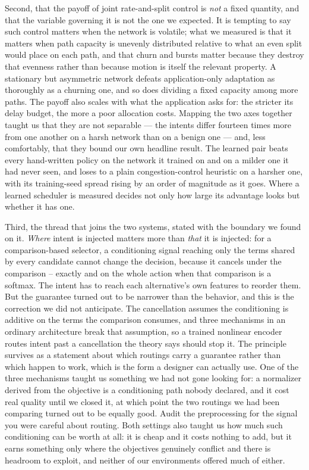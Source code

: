 Second, that the payoff of joint rate-and-split control is \emph{not} a fixed quantity, and that the
variable governing it is not the one we expected. It is tempting to say such control matters when the
network is volatile; what we measured is that it matters when path capacity is unevenly distributed
relative to what an even split would place on each path, and that churn and bursts matter because they
destroy that evenness rather than because motion is itself the relevant property. A stationary but
asymmetric network defeats application-only adaptation as thoroughly as a churning one, and so does
dividing a fixed capacity among more paths. The payoff also
scales with what the application asks for: the stricter its delay budget, the more a poor allocation
costs. Mapping the two axes together taught us that they are not separable --- the intents differ
fourteen times more from one another on a harsh network than on a benign one --- and, less comfortably,
that they bound our own headline result. The learned pair beats every hand-written policy on the network
it trained on and on a milder one it had never seen, and loses to a plain congestion-control heuristic
on a harsher one, with its training-seed spread rising by an order of magnitude as it goes. Where a
learned scheduler is measured decides not only how large its advantage looks but whether it has one.

Third, the thread that joins the two systems, stated with the boundary we found on it. \emph{Where}
intent is injected matters more than \emph{that} it is injected: for a comparison-based selector, a
conditioning signal reaching only the terms shared by every candidate cannot change the decision,
because it cancels under the comparison -- exactly and on the whole action when that comparison is a
softmax. The intent has to reach each alternative's own features to reorder them. But the guarantee
turned out to be narrower than the behavior, and this is the correction we did not anticipate. The
cancellation assumes the conditioning is additive on the terms the comparison consumes, and three
mechanisms in an ordinary architecture break that assumption, so a trained nonlinear encoder routes
intent past a cancellation the theory says should stop it. The principle survives as a statement about
which routings carry a guarantee rather than which happen to work, which is the form a designer can
actually use. One of the three mechanisms taught us something we had not gone looking for: a normalizer
derived from the objective is a conditioning path nobody declared, and it cost real quality until we
closed it, at which point the two routings we had been comparing turned out to be equally good. Audit
the preprocessing for the signal you were careful about routing. Both settings also taught us how much
such conditioning can be worth at all: it is cheap
and it costs nothing to add, but it earns something only where the objectives genuinely conflict and
there is headroom to exploit, and neither of our environments offered much of either.

